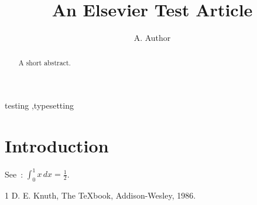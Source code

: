 \documentclass[preprint,12pt]{elsarticle}
\begin{document}
\begin{frontmatter}
\title{An Elsevier Test Article}
\author{A. Author}
\address{Some University}
\begin{abstract}
A short abstract.
\end{abstract}
\begin{keyword}
testing \sep typesetting
\end{keyword}
\end{frontmatter}
\linenumbers
\section{Introduction}
See~\cite{knuth}: $\int_0^1 x\,dx = \tfrac12$.
\begin{thebibliography}{1}
 D. E. Knuth, The {\TeX}book, Addison-Wesley, 1986.
\end{thebibliography}
\end{document}
